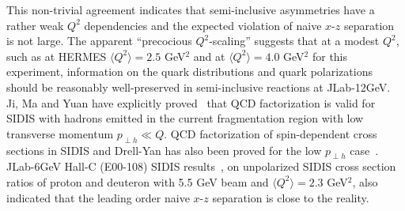 This non-trivial agreement indicates that semi-inclusive asymmetries have a rather weak $Q^2$ dependencies and 
the expected violation of naive \lo $x$-$z$ separation is not large.  
The apparent ``precocious $Q^2$-scaling'' suggests that at a modest $Q^2$, such as at HERMES $\langle Q^2 \rangle=2.5$ GeV$^2$ and 
at $\langle Q^2 \rangle=4.0$ GeV$^2$ for this experiment, information on the  quark distributions and quark polarizations should be reasonably  
well-preserved in semi-inclusive reactions at JLab-12GeV.   Ji, Ma and Yuan have  
explicitly proved~\cite{Ji:2004wu} that QCD factorization is valid for SIDIS with 
hadrons emitted in the current fragmentation region with low  
transverse momentum $p_{\perp h } \ll Q$.  QCD factorization of spin-dependent
cross sections in SIDIS and Drell-Yan has also been proved
 for the low $p_{\perp h }$ case~\cite{Ji:2004xq}.
JLab-6GeV  Hall-C (E00-108) SIDIS  results~\cite{Navasardyan:2006gv, Asaturyan:2011mq}, on unpolarized SIDIS cross section ratios
of proton and deuteron with 5.5 GeV beam and $\langle Q^2 \rangle=2.3$ GeV$^2$,  
also indicated that the leading order naive $x$-$z$ separation is close to the reality. 


